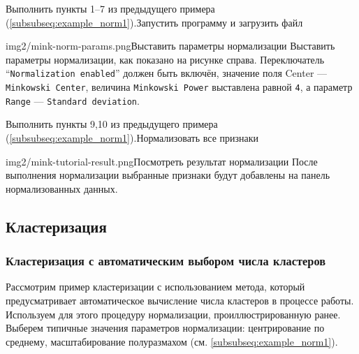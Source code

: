 \documentclass[12pt,tikz]{instruction}
\begin{document}
\begin{steps}
	\begin{istt}{Выполнить пункты 1--7 из предыдущего примера (\ref{subsubseq:example_norm1}).}{Запустить программу и загрузить файл}
	\end{istt}
	\begin{ist}{img2/mink-norm-params.png}{Выставить параметры нормализации}
		Выставить параметры нормализации, как показано на рисунке справа. Переключатель ``\texttt{Normalization enabled}'' должен быть включён, значение поля Center --- \texttt{Minkowski Center}, величина \texttt{Minkowski Power} выставлена равной \texttt{4}, а параметр \texttt{Range} --- \texttt{Standard deviation}.
	\end{ist}
	\begin{istt}{Выполнить пункты 9,10 из предыдущего примера (\ref{subsubseq:example_norm1}).}{Нормализовать все признаки}
	\end{istt}
	\begin{ist}{img2/mink-tutorial-result.png}{Посмотреть результат нормализации}
		После выполнения нормализации выбранные признаки будут добавлены на панель нормализованных данных.
	\end{ist}
\end{steps}

\subsection{Кластеризация}
\subsubsection{Кластеризация с автоматическим выбором числа кластеров}
\label{subsubsec:clustering_example1}
Рассмотрим пример кластеризации с использованием метода, который предусматривает автоматическое вычисление числа кластеров в процессе работы. Используем для этого процедуру нормализации, проиллюстрированную ранее. Выберем типичные значения параметров нормализации: центрирование по среднему, масштабирование полуразмахом (см. \ref{subsubseq:example_norm1}). 
\end{document}
